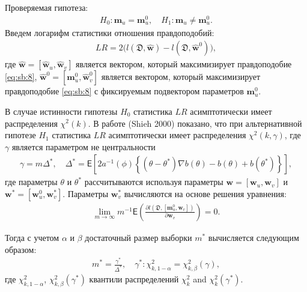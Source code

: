Проверяемая гипотеза:
\[
\label{eq:sb:9}
\begin{aligned}
	H_0: \textbf{m}_{u} = \textbf{m}^0_{u}, \quad H_1: \textbf{m}_{u} \not= \textbf{m}^0_{u}.
\end{aligned}
\]
Введем логарифм статистики отношения правдоподобий:
\[
\label{eq:sb:10}
\begin{aligned}
	LR = 2\Big(l\left(\mathfrak{D}, \hat{\textbf{w}}\right) - l\left(\mathfrak{D}, \hat{\textbf{w}}^0\right)\Big),
\end{aligned}
\]
где $\hat{\textbf{w}} = [\hat{\textbf{w}}_{u},\hat{\textbf{w}}_{v}]$ является вектором, который максимизирует правдоподобие \eqref{eq:sb:8}, $\hat{\textbf{w}}^{0} = [\textbf{m}^{0}_{u},\hat{\textbf{w}}^{0}_{v}]$ является вектором, который максимизирует правдоподобие \eqref{eq:sb:8} с фиксируемым подвектором параметров $\textbf{m}^{0}_{u}$.

В случае истинности гипотезы $H_0$ статистика $LR$ асимптотически имеет распределения $\chi^2(k)$.  В работе (Shieh 2000) показано, что при альтернативной гипотезе $H_1$ статистика  $LR$ асимптотически имеет распределения $\chi^2(k,\gamma)$, где $\gamma$ является параметром не центральности
\[
\label{eq:sb:11}
\begin{aligned}
	\gamma = m\Delta^*, \quad \Delta^* = \mathsf{E}\left[2a^{-1}(\phi)\left\{\left(\theta - \theta^*\right)\nabla b(\theta) - b(\theta) + b(\theta^*)\right\}\right], 
\end{aligned}
\]
где параметры $\theta$ и $\theta^*$ рассчитываются используя параметры $\textbf{w} = [\textbf{w}_{u}, \textbf{w}_{v}]$ и $\textbf{w}^* = [\textbf{w}^{0}_{u}, \textbf{w}^{*}_{v}]$. Параметры $\textbf{w}^{*}_{v}$ вычисляются на основе решения уравнения:
\[
\label{eq:sb:12}
\begin{aligned}
	\lim_{m\to\infty}m^{-1}\mathsf{E}\left(\frac{\partial l\left(\mathfrak{D}, \left[\textbf{m}^{0}_{u}, \textbf{w}_{v}\right]\right)}{\partial \textbf{w}_{v}}\right) = 0.
\end{aligned}
\]
	
Тогда с учетом $\alpha$ и $\beta$ достаточный размер выборки  $m^*$ вычисляется следующим образом:
\[
\label{eq:sb:13}
\begin{aligned}
	m^* = \frac{\gamma^*}{\Delta^*}, \quad \gamma^*:\chi^2_{k, 1-\alpha} = \chi^2_{k, \beta}\left(\gamma\right), 
\end{aligned}
\]
где $\chi^2_{k, 1-\alpha}$, $\chi^2_{k, \beta}\left(\gamma^*\right)$ квантили распределений $\chi^{2}_k$ and $\chi^2_{k}\left(\gamma^*\right)$.
	
